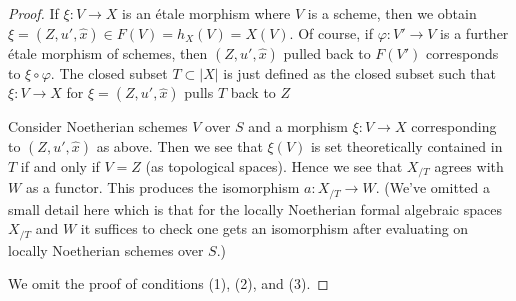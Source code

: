 \begin{proof}
\medskip\noindent
If $\xi : V \to X$ is an \'etale morphism where $V$ is a scheme, then
we obtain $\xi = (Z, u', \hat x) \in F(V) = h_X(V) = X(V)$.
Of course, if $\varphi : V' \to V$ is a further \'etale morphism of schemes,
then $(Z, u', \hat x)$ pulled back to $F(V')$ corresponds to
$\xi \circ \varphi$.
The closed subset $T \subset |X|$ is just defined as the closed
subset such that $\xi : V \to X$ for $\xi = (Z, u', \hat x)$
pulls $T$ back to $Z$

\medskip\noindent
Consider Noetherian schemes $V$ over $S$ and a morphism
$\xi : V \to X$ corresponding to $(Z, u', \hat x)$ as above.
Then we see that $\xi(V)$ is set theoretically contained in $T$
if and only if $V = Z$ (as topological spaces). Hence we see that
$X_{/T}$ agrees with $W$ as a functor. This produces the isomorphism
$a : X_{/T} \to W$. (We've omitted a small detail here which is
that for the locally Noetherian formal algebraic spaces $X_{/T}$ and
$W$ it suffices to check one gets an isomorphism after evaluating
on locally Noetherian schemes over $S$.)

\medskip\noindent
We omit the proof of conditions (1), (2), and (3).
\end{proof}

